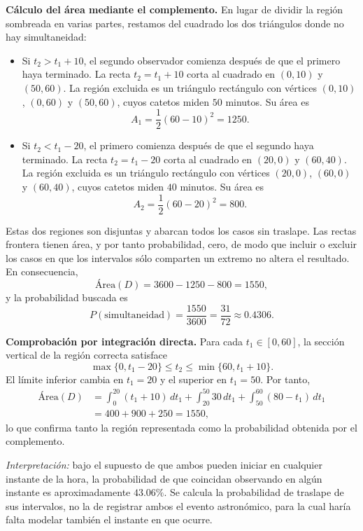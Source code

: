 \documentclass[a4paper]{article}
\begin{document}
\begin{enumerate}[a.]
\textbf{Cálculo del área mediante el complemento.}
En lugar de dividir la región sombreada en varias partes, restamos del cuadrado los dos triángulos donde no hay simultaneidad:
\begin{itemize}
\item Si $t_2>t_1+10$, el segundo observador comienza después de que el primero haya terminado. La recta $t_2=t_1+10$ corta al cuadrado en $(0,10)$ y $(50,60)$. La región excluida es un triángulo rectángulo con vértices $(0,10)$, $(0,60)$ y $(50,60)$, cuyos catetos miden $50$ minutos. Su área es
$$A_1=\frac{1}{2}(60-10)^2=1250.$$
\item Si $t_2<t_1-20$, el primero comienza después de que el segundo haya terminado. La recta $t_2=t_1-20$ corta al cuadrado en $(20,0)$ y $(60,40)$. La región excluida es un triángulo rectángulo con vértices $(20,0)$, $(60,0)$ y $(60,40)$, cuyos catetos miden $40$ minutos. Su área es
$$A_2=\frac{1}{2}(60-20)^2=800.$$
\end{itemize}
Estas dos regiones son disjuntas y abarcan todos los casos sin traslape. Las rectas frontera tienen área, y por tanto probabilidad, cero, de modo que incluir o excluir los casos en que los intervalos sólo comparten un extremo no altera el resultado. En consecuencia,
$$
\text{Área}(D)=3600-1250-800=1550,
$$
y la probabilidad buscada es
$$
\boxed{P(\text{simultaneidad})=\frac{1550}{3600}=\frac{31}{72}\approx 0.4306.}
$$

\textbf{Comprobación por integración directa.}
Para cada $t_1\in[0,60]$, la sección vertical de la región correcta satisface
$$
\max\{0,t_1-20\}\le t_2\le\min\{60,t_1+10\}.
$$
El límite inferior cambia en $t_1=20$ y el superior en $t_1=50$. Por tanto,
\begin{align*}
\text{Área}(D)
&=\int_0^{20}(t_1+10)\,dt_1
 +\int_{20}^{50}30\,dt_1
 +\int_{50}^{60}(80-t_1)\,dt_1\\
&=400+900+250=1550,
\end{align*}
lo que confirma tanto la región representada como la probabilidad obtenida por el complemento.

\textit{Interpretación:} bajo el supuesto de que ambos pueden iniciar en cualquier instante de la hora, la probabilidad de que coincidan observando en algún instante es aproximadamente $43.06\%$. Se calcula la probabilidad de traslape de sus intervalos, no la de registrar ambos el evento astronómico, para la cual haría falta modelar también el instante en que ocurre.
\end{enumerate}
\end{document}
